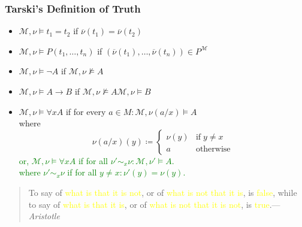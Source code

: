 \documentclass[UTF8,aspectratio=43,11pt,colorlinks,compress,openany]{beamer}%
\begin{document}
\begin{frame}\frametitle{Tarski's Definition of Truth}
		\begin{definition}
			\begin{itemize}
				\item $\mathcal{M},\nu\vDash t_1=t_2$ if $\overline{\nu}(t_1)=\overline{\nu}(t_2)$
				\item $\mathcal{M},\nu\vDash P(t_1,\dots,t_n)$ if $(\overline{\nu}(t_1),\dots,\overline{\nu}(t_n))\in P^{\mathcal{M}}$
				\item $\mathcal{M},\nu\vDash\neg A$ if $\mathcal{M},\nu\nvDash A$
				\item $\mathcal{M},\nu\vDash A\to B$ if $\mathcal{M},\nu\nvDash A$\;\;\;\;$\mathcal{M},\nu\vDash B$
				\item $\mathcal{M},\nu\vDash\forall x A$ if for every $a\in M: \mathcal{M},\nu(a/x)\vDash A$\\
				where
				\[\nu(a/x)(y)\coloneqq 
				\begin{cases}
				\nu(y) &\text{if}\;y\neq x\\
				a &\text{otherwise}
				\end{cases}\]
				\textcolor{green}{or,
					$\mathcal{M},\nu\vDash\forall x A$ if for all $\nu'\sim_x\nu: \mathcal{M},\nu'\vDash A$.\\
					where $\nu'\sim_x\nu$ if for all $y\neq x:\nu'(y)=\nu(y)$.}
			\end{itemize}
		\end{definition}
	\begin{quote}
	To say of \textcolor{yellow}{what is that it is not}, or of \textcolor{yellow}{what is not that it is}, is \textcolor{yellow}{false}, while to say of \textcolor{yellow}{what is that it is}, or of \textcolor{yellow}{what is not that it is not}, is \textcolor{yellow}{true}.\hfill --- \textsl{Aristotle}
	\end{quote}
\end{frame}
\end{document}
